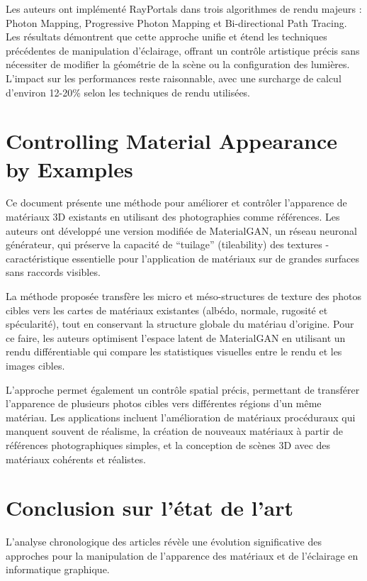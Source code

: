 \documentclass{article}
\begin{document}
Les auteurs ont implémenté RayPortals dans trois algorithmes de rendu majeurs : Photon Mapping, Progressive Photon Mapping et Bi-directional Path Tracing. Les résultats démontrent que cette approche unifie et étend les techniques précédentes de manipulation d'éclairage, offrant un contrôle artistique précis sans nécessiter de modifier la géométrie de la scène ou la configuration des lumières. L'impact sur les performances reste raisonnable, avec une surcharge de calcul d'environ 12-20\% selon les techniques de rendu utilisées.

\newpage
\section{Controlling Material Appearance by Examples}
Ce document présente une méthode pour améliorer et contrôler l'apparence de matériaux 3D existants en utilisant des photographies comme références. Les auteurs ont développé une version modifiée de MaterialGAN, un réseau neuronal générateur, qui préserve la capacité de ``tuilage'' (tileability) des textures - caractéristique essentielle pour l'application de matériaux sur de grandes surfaces sans raccords visibles.

La méthode proposée transfère les micro et méso-structures de texture des photos cibles vers les cartes de matériaux existantes (albédo, normale, rugosité et spécularité), tout en conservant la structure globale du matériau d'origine. Pour ce faire, les auteurs optimisent l'espace latent de MaterialGAN en utilisant un rendu différentiable qui compare les statistiques visuelles entre le rendu et les images cibles.

L'approche permet également un contrôle spatial précis, permettant de transférer l'apparence de plusieurs photos cibles vers différentes régions d'un même matériau. Les applications incluent l'amélioration de matériaux procéduraux qui manquent souvent de réalisme, la création de nouveaux matériaux à partir de références photographiques simples, et la conception de scènes 3D avec des matériaux cohérents et réalistes.

\newpage
\section{Conclusion sur l'état de l'art}

L'analyse chronologique des articles révèle une évolution significative des approches pour la manipulation de l'apparence des matériaux et de l'éclairage en informatique graphique.
\end{document}
